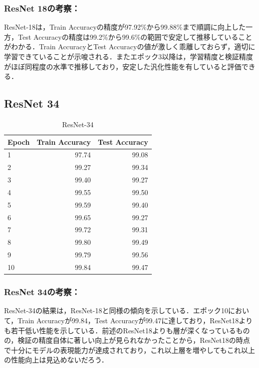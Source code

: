 \documentclass[a4paper,11pt,titlepage]{jsarticle}
\begin{document}
\subsubsection*{ResNet 18の考察：}
ResNet-18は，Train Accuracyの精度が97.92\%から99.88\%まで順調に向上した一方，Test Accuracyの精度は99.2\%から99.6\%の範囲で安定して推移していることがわかる．Train AccuracyとTest Accuracyの値が激しく乖離しておらず，適切に学習できていることが示唆される．またエポック3以降は，学習精度と検証精度がほぼ同程度の水準で推移しており，安定した汎化性能を有していると評価できる．


\subsection{ResNet 34}
\begin{table}[h]
\centering
\caption{ResNet-34}
\label{tab:ResNet34}
\begin{tabular}{lrr}
\hline
 Epoch &  Train Accuracy &  Test Accuracy \\
\hline
     1 &           97.74 &                99.08 \\
     2 &           99.27 &                99.34 \\
     3 &           99.40 &                99.27 \\
     4 &           99.55 &                99.50 \\
     5 &           99.59 &                99.40 \\
     6 &           99.65 &                99.27 \\
     7 &           99.72 &                99.31 \\
     8 &           99.80 &                99.49 \\
     9 &           99.79 &                99.56 \\
    10 &           99.84 &                99.47 \\
\hline
\end{tabular}
\end{table}

\subsubsection*{ResNet 34の考察：}
ResNet-34の結果は，ResNet-18と同様の傾向を示している．エポック10において，Train Accuracyが99.84，Test Accuracyが99.47に達しており，ResNet18よりも若干低い性能を示している．前述のResNet18よりも層が深くなっているものの，検証の精度自体に著しい向上が見られなかったことから，ResNet18の時点で十分にモデルの表現能力が達成されており，これ以上層を増やしてもこれ以上の性能向上は見込めないだろう．
\end{document}
